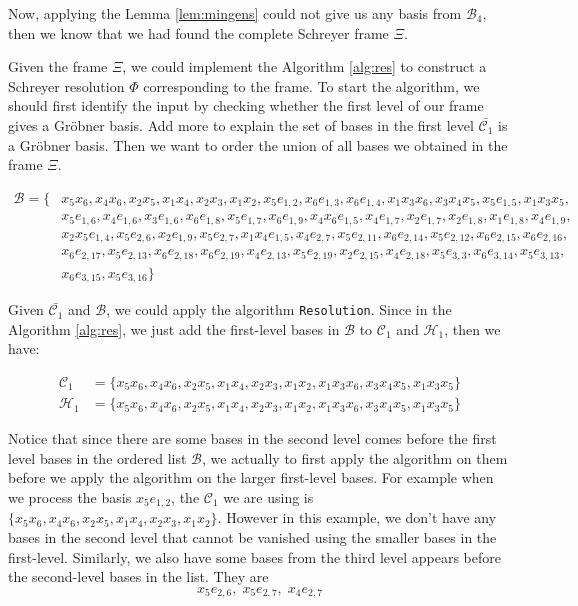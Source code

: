 \documentclass{article}
\theoremstyle{definition}
\theoremstyle{remark}
\theoremstyle{example}
\begin{document}
Now, applying the Lemma \ref{lem:mingens} could not give us any basis from $\mathcal{B}_4$, then we know that we had found the complete Schreyer frame $\Xi$.

Given the frame $\Xi$, we could implement the Algorithm \ref{alg:res} to construct a Schreyer resolution $\Phi$ corresponding to the frame. To start the algorithm, we should first identify the input by checking whether the first level of our frame gives a Gröbner basis. \textcolor{BrickRed}{Add more to explain the set of bases in the first level $\bar{\mathcal{C}_1}$ is a Gröbner basis}. Then we want to order the union of all bases we obtained in the frame $\Xi$.

\begin{equation}
    \begin{aligned}
        \mathcal{B} = \{&x_5x_6,x_4x_6,x_2x_5,x_1x_4,x_2x_3,x_1x_2,x_5e_{1,2},x_6e_{1,3},x_6e_{1,4},x_1x_3x_6,x_3x_4x_5,x_5e_{1,5},x_1x_3x_5, \\
                    & x_5e_{1,6},x_4e_{1,6},x_3e_{1,6},x_6e_{1,8},x_5e_{1,7},x_6e_{1,9},x_4x_6e_{1,5},x_4e_{1,7},x_2e_{1,7},x_2e_{1,8},x_1e_{1,8},x_4e_{1,9},\\
                    & x_2x_5e_{1,4},x_5e_{2,6},x_2e_{1,9},x_5e_{2,7},x_1x_4e_{1,5},x_4e_{2,7},x_5e_{2,11},x_6e_{2,14},x_5e_{2,12},x_6e_{2,15},x_6e_{2,16},\\
                    & x_6e_{2,17},x_5e_{2,13},x_6e_{2,18}, x_6e_{2,19},x_4e_{2,13},x_5e_{2,19},x_2e_{2,15},x_4e_{2,18},x_5e_{3,3},x_6e_{3,14},x_5e_{3,13},\\
                    & x_6e_{3,15},x_5e_{3,16}\}
    \end{aligned}
\end{equation}

Given $\bar{\mathcal{C}_1}$ and $\mathcal{B}$, we could apply the algorithm \verb+Resolution+. Since in the Algorithm \ref{alg:res}, we just add the first-level bases in $\mathcal{B}$ to $\mathcal{C}_1$ and $\mathcal{H}_1$, then we have:

\begin{align}
        \mathcal{C}_1 &= \{x_5x_6,x_4x_6,x_2x_5,x_1x_4,x_2x_3,x_1x_2,x_1x_3x_6,x_3x_4x_5,x_1x_3x_5\}\\
        \mathcal{H}_1 &= \{x_5x_6,x_4x_6,x_2x_5,x_1x_4,x_2x_3,x_1x_2,x_1x_3x_6,x_3x_4x_5,x_1x_3x_5\}
\end{align}

Notice that since there are some bases in the second level comes before the first level bases in the ordered list $\mathcal{B}$, we actually to first apply the algorithm on them before we apply the algorithm on the larger first-level bases. For example when we process the basis $x_5e_{1,2}$, the $\mathcal{C}_1$ we are using is $\{x_5x_6,x_4x_6,x_2x_5,x_1x_4,x_2x_3,x_1x_2\}$. However in this example, we don't have any bases in the second level that cannot be vanished using the smaller bases in the first-level. Similarly, we also have some bases from the third level appears before the second-level bases in the list. They are 
\begin{equation}
    x_5e_{2,6},\;x_5e_{2,7},\;x_4e_{2,7}
\end{equation}
\end{document}
